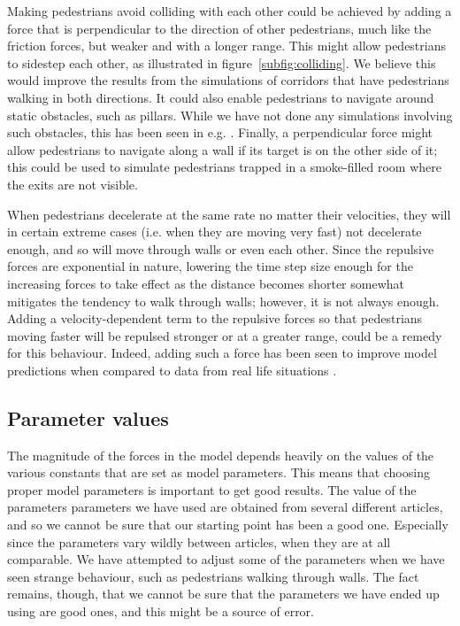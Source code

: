 Making pedestrians avoid colliding with each other could be achieved by adding 
a force that is perpendicular to the direction of other pedestrians, much like 
the friction forces, but weaker and with a longer range. This might allow 
pedestrians to sidestep each other, as illustrated in 
figure~\ref{subfig:colliding}. We believe this would improve the results from 
the simulations of corridors that have pedestrians walking in both directions.  
It could also enable pedestrians to navigate around static obstacles, such as 
pillars. While we have not done any simulations involving such obstacles, this 
has been seen in e.g. \cite{tang}. Finally, a perpendicular force might allow 
pedestrians to navigate along a wall if its target is on the other side of it; 
this could be used to simulate pedestrians trapped in a smoke-filled room 
where the exits are not visible.

When pedestrians decelerate at the same rate no matter their velocities, they 
will in certain extreme cases (i.e. when they are moving very fast) not 
decelerate enough, and so will move through walls or even each other. Since 
the repulsive forces are exponential in nature, lowering the time step size 
enough for the increasing forces to take effect as the distance becomes 
shorter somewhat mitigates the tendency to walk through walls; however, it is 
not always enough. Adding a velocity-dependent term to the repulsive forces so 
that pedestrians moving faster will be repulsed stronger or at a greater 
range, could be a remedy for this behaviour. Indeed, adding such a force has 
been seen to improve model predictions when compared to data from real life 
situations \cite{ABconstant}.

\subsection{Parameter values}
The magnitude of the forces in the model depends heavily on the values of the 
various constants that are set as model parameters. This means that choosing 
proper model parameters is important to get good results.
The value of the parameters parameters we have 
used are obtained from several different articles, and so we cannot be sure 
that our starting point has been a good one. Especially since the parameters 
vary wildly between articles, when they are at all comparable. We have 
attempted to adjust some of the parameters when we have seen strange 
behaviour, such as pedestrians walking through walls. The fact remains, 
though, that we cannot be sure that the parameters we have ended up using are 
good ones, and this might be a source of error.

